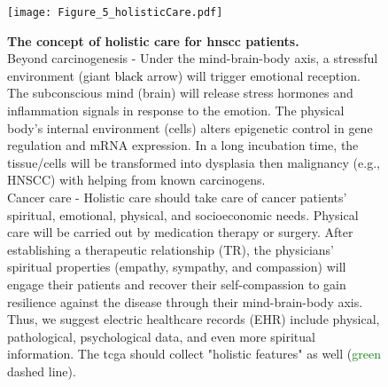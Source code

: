 \documentclass[jpm,article,submit,moreauthors,pdftex]{Definitions/mdpi}
\newcommand{\bcaption}[2]{\caption{\textbf{#1} #2}}
\begin{document}
\begin{paracol}{2}
\begin{figure}[hbt!]
\centering
\texttt{[image: Figure\_5\_holisticCare.pdf]}
\bcaption{The concept of holistic care for \acrshort{hnscc} patients.}
{\\Beyond carcinogenesis - Under the mind-brain-body axis, a stressful environment (giant \textcolor{black}{black} arrow) will trigger emotional reception. The subconscious mind (brain) will release stress hormones and inflammation signals in response to the emotion. The physical body's internal environment (cells) alters epigenetic control in gene regulation and mRNA expression. In a long incubation time, the tissue/cells will be transformed into dysplasia then malignancy (e.g., HNSCC) with helping from known carcinogens.\\
Cancer care - Holistic care should take care of cancer patients' spiritual, emotional, physical, and socioeconomic needs. Physical care will be carried out by medication therapy or surgery. After establishing a therapeutic relationship (TR), the physicians' spiritual properties (empathy, sympathy, and compassion) will engage their patients and recover their self-compassion to gain resilience against the disease through their mind-brain-body axis.
Thus, we suggest electric healthcare records (EHR) include physical, pathological, psychological data, and even more spiritual information. The \acrshort{tcga} should collect "holistic features" as well (\textcolor{green}{green} dashed line).}
\label{fig:figure5}
\end{figure}
\clearpage





\end{paracol}
\end{document}
